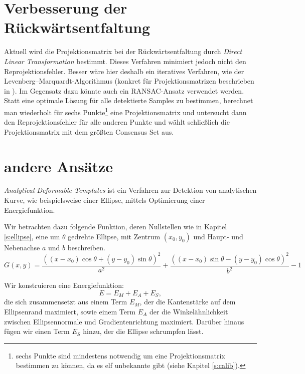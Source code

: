 \section{Verbesserung der Rückwärtsentfaltung}
Aktuell wird die Projektionsmatrix bei der Rückwärtsentfaltung durch \textit{Direct Linear Transformation} bestimmt. Dieses Verfahren minimiert jedoch nicht den Reprojektionsfehler. Besser wäre hier deshalb ein iteratives Verfahren, wie der Levenberg–Marquardt-Algorithmus (konkret für Projektionsmatrizen beschrieben in \cite{Hartley2000}). %
Im Gegensatz dazu könnte auch ein RANSAC-Ansatz verwendet werden. Statt eine optimale Lösung für alle detektierte Samples zu bestimmen, berechnet man wiederholt für sechs Punkte\footnote{sechs Punkte sind mindestens notwendig um eine Projektionsmatrix bestimmen zu können, da es elf unbekannte gibt (siehe Kapitel \ref{s:calib}).} eine Projektionsmatrix und untersucht dann den Reprojektionsfehler für alle anderen Punkte und wählt schließlich die Projektionsmatrix mit dem größten Consensus Set aus. 



\section{andere Ansätze}
\textit{Analytical Deformable Templates} ist ein Verfahren zur Detektion von analytischen Kurve, wie beispielsweise einer Ellipse, mittels Optimierung einer Energiefunktion. 

Wir betrachten dazu folgende Funktion, deren Nullstellen wie in Kapitel \ref{s:ellipse}, eine um $\theta$ gedrehte Ellipse, mit Zentrum $(x_0,y_0)$ und Haupt- und Nebenachse $a$ und $b$ beschreiben. 
\begin{equation*}
	G(x,y) = \frac{((x - x_0)\cos\theta + (y - y_0)\sin\theta)^2}{a^2} + \frac{((x - x_0)\sin\theta - (y - y_0)\cos\theta)^2}{b^2} - 1
\end{equation*}

Wir konstruieren eine Energiefunktion:
\begin{equation*}
	E = E_M + E_A + E_S,
\end{equation*}
die sich zusammensetzt aus einem Term $E_M$, der die Kantenstärke auf dem Ellipsenrand maximiert, sowie einem Term $E_A$ der die Winkelähnlichkeit zwischen Ellipsennormale und Gradientenrichtung maximiert. Darüber hinaus fügen wir einen Term $E_S$ hinzu, der die Ellipse schrumpfen lässt. 

